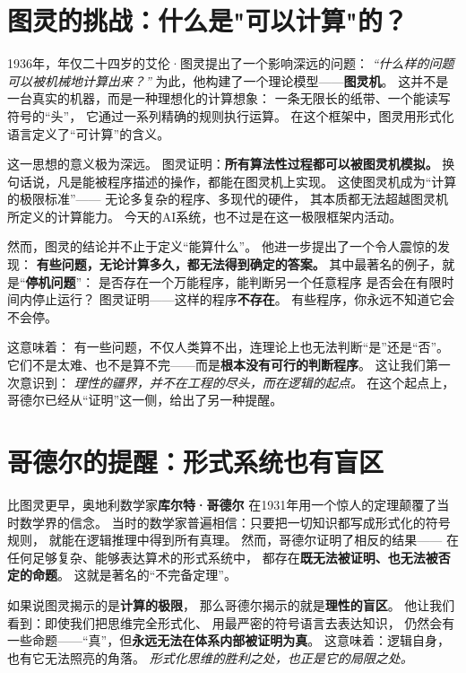\section*{图灵的挑战：什么是"可以计算"的？}

1936年，年仅二十四岁的艾伦·图灵提出了一个影响深远的问题：  
\textit{“什么样的问题可以被机械地计算出来？”}  
为此，他构建了一个理论模型——\textbf{图灵机}。  
这并不是一台真实的机器，而是一种理想化的计算想象：  
一条无限长的纸带、一个能读写符号的“头”，  
它通过一系列精确的规则执行运算。  
在这个框架中，图灵用形式化语言定义了“可计算”的含义。

这一思想的意义极为深远。  
图灵证明：\textbf{所有算法性过程都可以被图灵机模拟。}  
换句话说，凡是能被程序描述的操作，都能在图灵机上实现。  
这使图灵机成为“计算的极限标准”——  
无论多复杂的程序、多现代的硬件，  
其本质都无法超越图灵机所定义的计算能力。  
今天的AI系统，也不过是在这一极限框架内活动。

然而，图灵的结论并不止于定义“能算什么”。  
他进一步提出了一个令人震惊的发现：  
\textbf{有些问题，无论计算多久，都无法得到确定的答案。}  
其中最著名的例子，就是“\textbf{停机问题}”：  
是否存在一个万能程序，能判断另一个任意程序  
是否会在有限时间内停止运行？  
图灵证明——这样的程序\textbf{不存在}。  
有些程序，你永远不知道它会不会停。

这意味着：  
有一些问题，不仅人类算不出，连理论上也无法判断“是”还是“否”。  
它们不是太难、也不是算不完——而是\textbf{根本没有可行的判断程序}。  
这让我们第一次意识到：  
\textit{理性的疆界，并不在工程的尽头，而在逻辑的起点。}
在这个起点上，哥德尔已经从“证明”这一侧，给出了另一种提醒。

\section*{哥德尔的提醒：形式系统也有盲区}

比图灵更早，奥地利数学家\textbf{库尔特·哥德尔}  
在1931年用一个惊人的定理颠覆了当时数学界的信念。  
当时的数学家普遍相信：只要把一切知识都写成形式化的符号规则，  
就能在逻辑推理中得到所有真理。  
然而，哥德尔证明了相反的结果——  
在任何足够复杂、能够表达算术的形式系统中，  
都存在\textbf{既无法被证明、也无法被否定的命题}。  
这就是著名的“不完备定理”。

如果说图灵揭示的是\textbf{计算的极限}，  
那么哥德尔揭示的就是\textbf{理性的盲区}。  
他让我们看到：即使我们把思维完全形式化、  
用最严密的符号语言去表达知识，  
仍然会有一些命题——“真”，但\textbf{永远无法在体系内部被证明为真}。  
这意味着：逻辑自身，也有它无法照亮的角落。  
\textit{形式化思维的胜利之处，也正是它的局限之处。}

